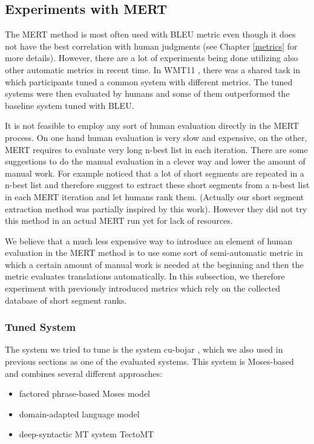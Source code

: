 \subsection{Experiments with MERT}

The MERT method is most often used with BLEU metric even though it does not
have the best correlation with human judgments (see Chapter \ref{metrics}
for more details). However, there are a lot of experiments being done utilizing also
other automatic metrics in recent time. In WMT11 , there was a
shared task in which participants tuned a common system with different metrics.
The tuned systems were then evaluated by humans and some of them outperformed
the baseline system tuned with BLEU.

It is not feasible to employ any sort of human evaluation directly in the MERT
process. On one hand human evaluation is very slow and expensive, on the
other, MERT requires to evaluate very long n-best list in each iteration.
There are some suggestions to do the manual evaluation in a clever way and
lower the amount of manual work. For example 
noticed that a lot of short segments are repeated in a n-best list and therefore
suggest to extract these short segments from a n-best list in each MERT
iteration and let humans rank them. (Actually our short segment extraction
method was partially inspired by this work). However they did not try this
method in an actual MERT run yet for lack of resources. 

We believe that a much less expensive way to introduce an element of human
evaluation in the MERT method is to use some sort of semi-automatic metric in which
a certain amount of manual work is needed at the beginning and then the metric
evaluates translations automatically. In this subsection, we therefore
experiment with previously introduced metrics which rely on the collected
database of short segment ranks.

\subsubsection{Tuned System}

The system we tried to tune is the system cu-bojar ,
which we also used in previous sections as one of the evaluated systems. This
system is Moses-based and combines several different approaches:

\begin{itemize}
  \item factored phrase-based Moses model
  \item domain-adapted language model
  \item deep-syntactic MT system TectoMT
\end{itemize}

